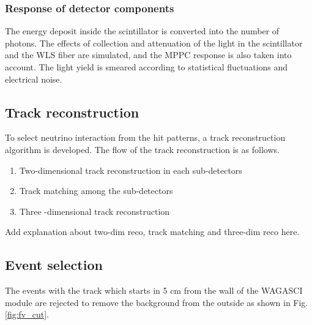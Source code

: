 \subsubsection{Response of detector components}
The energy deposit inside the scintillator is converted into the number of photons. 
The effects of collection and attenuation of the light in the scintillator and the WLS fiber are simulated, and the MPPC response is also taken into account. 
The light yield is smeared according to statistical fluctuations and electrical noise.


\subsection{Track reconstruction}
To select neutrino interaction from the hit patterns, a track reconstruction algorithm is developed.
The flow of the track reconstruction is as follows.
\begin{enumerate}
\item Two-dimensional track reconstruction in each sub-detectors
\item Track matching among the sub-detectors
\item Three -dimensional track reconstruction
\end{enumerate}

Add explanation about two-dim reco, track matching and three-dim reco here.


\subsection{Event selection}

The events with the track which starts in 5 cm from the wall of the WAGASCI module are rejected to remove the background from the outside as shown in Fig. \ref{fig:fv_cut}.

